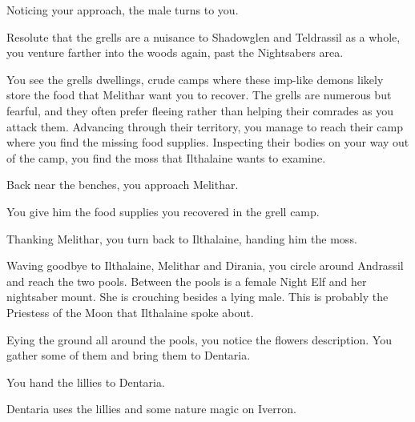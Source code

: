 
Noticing your approach, the male turns to you.


Resolute that the grells are a nuisance to Shadowglen and Teldrassil as a whole, you venture farther into the woods again, past the Nightsabers area.

You see the grells dwellings, crude camps where these imp-like demons likely store the food that Melithar want you to recover. The grells are numerous but fearful, and they often prefer fleeing rather than helping their comrades as you attack them. Advancing through their territory, you manage to reach their camp where you find the missing food supplies. Inspecting their bodies on your way out of the camp, you find the moss that Ilthalaine wants to examine.

Back near the benches, you approach Melithar.


You give him the food supplies you recovered in the grell camp.


Thanking Melithar, you turn back to Ilthalaine, handing him the moss.



Waving goodbye to Ilthalaine, Melithar and Dirania, you circle around Andrassil and reach the two pools. Between the pools is a female Night Elf and her nightsaber mount. She is crouching besides a lying male. This is probably the Priestess of the Moon that Ilthalaine spoke about.



Eying the ground all around the pools, you notice the flowers description. You gather some of them and bring them to Dentaria.


You hand the lillies to Dentaria.


Dentaria uses the lillies and some nature magic on Iverron.



